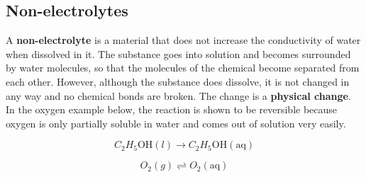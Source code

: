             \subsection*{Non-electrolytes}
            \nopagebreak
        \label{m38720*id339146}A \textbf{non-electrolyte} is a material that does not increase the conductivity of water when dissolved in it. The substance goes into solution and becomes surrounded by water molecules, so that the molecules of the chemical become separated from each other. However, although the substance does dissolve, it is not changed in any way and no chemical bonds are broken. The change is a \textbf{physical change}. In the oxygen example below, the reaction is shown to be reversible because oxygen is only partially soluble in water and comes out of solution very easily.\par 
        \label{m38720*id339165}\nopagebreak\noindent{}
          
    \begin{equation}
    {C}_{2}{H}_{5}\mathrm{OH}\left(l\right)\to {C}_{2}{H}_{5}\mathrm{OH}\left(\mathrm{aq}\right)\tag{17.7}
      \end{equation}
        \label{m38720*id339233}\nopagebreak\noindent{}
          
    \begin{equation}
    {O}_{2}\left(g\right)⇌{O}_{2}\left(\mathrm{aq}\right)\tag{17.8}
      \end{equation}
      \label{m38720*uid56}
